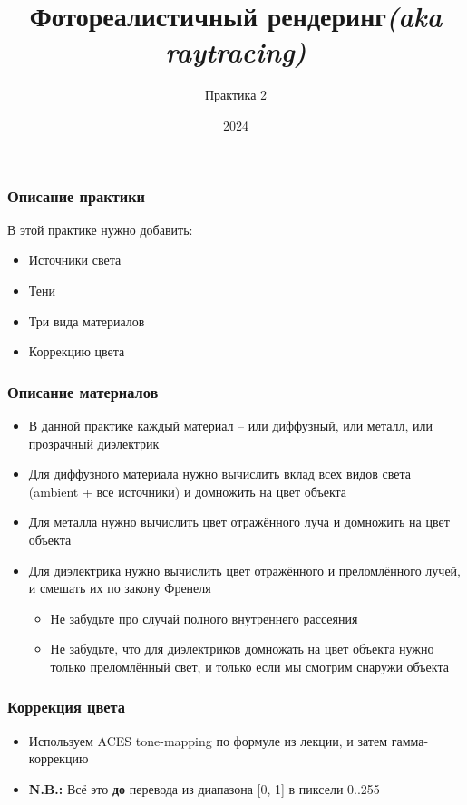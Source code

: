 \documentclass[10pt,handout]{beamer}
\title{Фотореалистичный рендеринг\quad\quad\quad\quad\quad\quad \textit{(aka raytracing)}}
\subtitle{Практика 2}
\date{2024}
\begin{document}
\frame{\titlepage}

\begin{frame}[fragile]
\frametitle{Описание практики}
В этой практике нужно добавить:
\begin{itemize}
\item Источники света
\item Тени
\item Три вида материалов
\item Коррекцию цвета
\end{itemize}
\end{frame}

\begin{frame}[fragile]
\frametitle{Описание материалов}
\begin{itemize}
\item В данной практике каждый материал -- или диффузный, или металл, или прозрачный диэлектрик
\pause
\item Для диффузного материала нужно вычислить вклад всех видов света (ambient + все источники) и домножить на цвет объекта
\pause
\item Для металла нужно вычислить цвет отражённого луча и домножить на цвет объекта
\pause
\item Для диэлектрика нужно вычислить цвет отражённого и преломлённого лучей, и смешать их по закону Френеля
\pause
\begin{itemize}
\item Не забудьте про случай полного внутреннего рассеяния
\pause
\item Не забудьте, что для диэлектриков домножать на цвет объекта нужно только преломлённый свет, и только если мы смотрим снаружи объекта
\end{itemize}
\end{itemize}
\end{frame}

\begin{frame}[fragile]
\frametitle{Коррекция цвета}
\begin{itemize}
\item Используем ACES tone-mapping по формуле из лекции, и затем гамма-коррекцию
\pause
\item \alert{\textbf{N.B.:}} Всё это \textbf{до} перевода из диапазона [0, 1] в пиксели 0..255
\end{itemize}
\end{frame}
\end{document}
